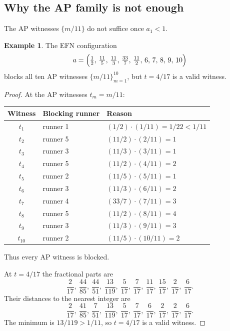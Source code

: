 \documentclass[12pt,a4paper]{amsart}
\theoremstyle{definition}
\newtheorem{example}[theorem]{Example}
\theoremstyle{remark}
\begin{document}
\subsection{Why the AP family is not enough}

The AP witnesses $\{m/11\}$ do not suffice once $a_1<1$.

\begin{example}\label{ex:ap-fail}
The EFN configuration
\[
  a = \Bigl(\tfrac{1}{2},\,\tfrac{11}{5},\,\tfrac{11}{3},\,\tfrac{33}{7},\,\tfrac{11}{2},
             \,6,\,7,\,8,\,9,\,10\Bigr)
\]
blocks all ten AP witnesses $\{m/11\}_{m=1}^{10}$, but $t=4/17$ is a valid witness.
\end{example}

\begin{proof}
At the AP witnesses $t_m=m/11$:

\medskip
\begin{center}
\begin{tabular}{cll}
\toprule
Witness & Blocking runner & Reason \\
\midrule
$t_1$ & runner 1 & $(1/2)\cdot(1/11)=1/22<1/11$ \\
$t_2$ & runner 5 & $(11/2)\cdot(2/11)=1$ \\
$t_3$ & runner 3 & $(11/3)\cdot(3/11)=1$ \\
$t_4$ & runner 5 & $(11/2)\cdot(4/11)=2$ \\
$t_5$ & runner 2 & $(11/5)\cdot(5/11)=1$ \\
$t_6$ & runner 3 & $(11/3)\cdot(6/11)=2$ \\
$t_7$ & runner 4 & $(33/7)\cdot(7/11)=3$ \\
$t_8$ & runner 5 & $(11/2)\cdot(8/11)=4$ \\
$t_9$ & runner 3 & $(11/3)\cdot(9/11)=3$ \\
$t_{10}$ & runner 2 & $(11/5)\cdot(10/11)=2$ \\
\bottomrule
\end{tabular}
\end{center}

\medskip\noindent
Thus every AP witness is blocked.

At $t=4/17$ the fractional parts are
\[
  \frac{2}{17},\ \frac{44}{85},\ \frac{44}{51},\ \frac{13}{119},\ \frac{5}{17},\
  \frac{7}{17},\ \frac{11}{17},\ \frac{15}{17},\ \frac{2}{17},\ \frac{6}{17}.
\]
Their distances to the nearest integer are
\[
  \frac{2}{17},\ \frac{41}{85},\ \frac{7}{51},\ \frac{13}{119},\ \frac{5}{17},\
  \frac{7}{17},\ \frac{6}{17},\ \frac{2}{17},\ \frac{2}{17},\ \frac{6}{17}.
\]
The minimum is $13/119>1/11$, so $t=4/17$ is a valid witness.
\end{proof}
\end{document}
